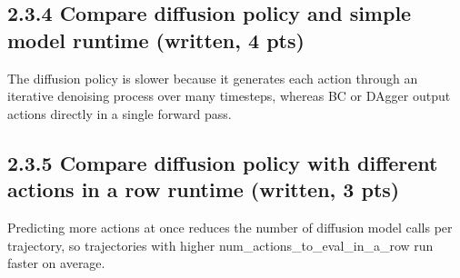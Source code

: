 \documentclass[12pt]{article}
\begin{document}
\subsection*{2.3.4 Compare diffusion policy and simple model runtime (written, 4 pts)}
\begin{tcolorbox}[fit,height=10em, width=40em, blank, borderline={1pt}{1pt},nobeforeafter]
            \begin{center}
            \vspace*{2em}

            The diffusion policy is slower because it generates each action through an iterative denoising process over many timesteps, whereas BC or DAgger output actions directly in a single forward pass.

            \end{center}
            \end{tcolorbox}
\subsection*{2.3.5 Compare diffusion policy with different actions in a row runtime (written, 3 pts)}
\begin{tcolorbox}[fit,height=10em, width=40em, blank, borderline={1pt}{1pt},nobeforeafter]
            \begin{center}
                \vspace*{2em}
                Predicting more actions at once reduces the number of diffusion model calls per trajectory, so trajectories with higher num\_actions\_to\_eval\_in\_a\_row run faster on average.
            \end{center}
            \end{tcolorbox}

\clearpage
\end{document}
